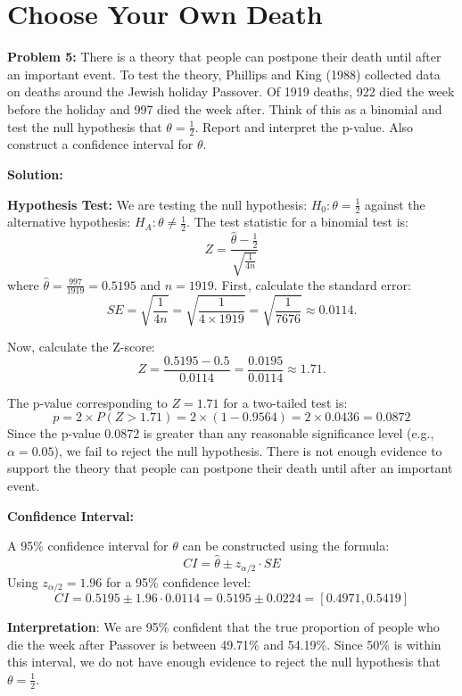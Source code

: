 \documentclass[12pt]{article}
\begin{document}
\section{Choose Your Own Death}

\textbf{Problem 5:} There is a theory that people can postpone their death until after an important event. To test the theory, Phillips and King (1988) collected data on deaths around the Jewish holiday Passover. Of 1919 deaths, 922 died the week before the holiday and 997 died the week after. Think of this as a binomial and test the null hypothesis that \( \theta = \frac{1}{2} \). Report and interpret the p-value. Also construct a confidence interval for \( \theta \).

\textbf{Solution:}

\textbf{Hypothesis Test:}
We are testing the null hypothesis:
$
H_0: \theta = \frac{1}{2}
$ 
against the alternative hypothesis:
$
H_A: \theta \neq \frac{1}{2}
$. 
The test statistic for a binomial test is:
\[
Z = \frac{\hat{\theta} - \frac{1}{2}}{\sqrt{\frac{1}{4n}}}
\]
where \( \hat{\theta} = \frac{997}{1919} = 0.5195 \) and \( n = 1919 \).
First, calculate the standard error:
\[
SE = \sqrt{\frac{1}{4n}} = \sqrt{\frac{1}{4 \times 1919}} = \sqrt{\frac{1}{7676}} \approx 0.0114.
\]

Now, calculate the Z-score:
\[
Z = \frac{0.5195 - 0.5}{0.0114} = \frac{0.0195}{0.0114} \approx 1.71.
\]

The p-value corresponding to \( Z = 1.71 \) for a two-tailed test is:
\[
p = 2 \times P(Z > 1.71) = 2 \times (1 - 0.9564) = 2 \times 0.0436 = 0.0872
\]
Since the p-value \( 0.0872 \) is greater than any reasonable significance level (e.g., \( \alpha = 0.05 \)), we fail to reject the null hypothesis. There is not enough evidence to support the theory that people can postpone their death until after an important event.

\textbf{Confidence Interval:}

A 95\% confidence interval for \( \theta \) can be constructed using the formula:
\[
CI = \hat{\theta} \pm z_{\alpha/2} \cdot SE
\]
Using \( z_{\alpha/2} = 1.96 \) for a 95\% confidence level:
\[
CI = 0.5195 \pm 1.96 \cdot 0.0114 = 0.5195 \pm 0.0224 = [0.4971, 0.5419]
\]

\textbf{Interpretation}: We are 95\% confident that the true proportion of people who die the week after Passover is between 49.71\% and 54.19\%. Since 50\% is within this interval, we do not have enough evidence to reject the null hypothesis that \( \theta = \frac{1}{2} \).
\end{document}
